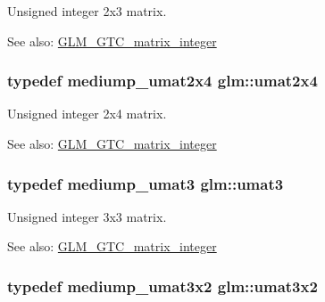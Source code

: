 Unsigned integer 2x3 matrix. \begin{Desc}
\item[See also:]\hyperlink{group__gtc__matrix__integer}{GLM\_\-GTC\_\-matrix\_\-integer} \end{Desc}
\hypertarget{group__gtc__matrix__integer_g3b23b164240cf4dfb429776da7be9d88}{
\subsubsection[umat2x4]{\setlength{\rightskip}{0pt plus 5cm}typedef mediump\_\-umat2x4 {\bf glm::umat2x4}}}
\label{group__gtc__matrix__integer_g3b23b164240cf4dfb429776da7be9d88}


Unsigned integer 2x4 matrix. \begin{Desc}
\item[See also:]\hyperlink{group__gtc__matrix__integer}{GLM\_\-GTC\_\-matrix\_\-integer} \end{Desc}
\hypertarget{group__gtc__matrix__integer_g8b8fbc858e28abf8fc344744f8d6d368}{
\subsubsection[umat3]{\setlength{\rightskip}{0pt plus 5cm}typedef mediump\_\-umat3 {\bf glm::umat3}}}
\label{group__gtc__matrix__integer_g8b8fbc858e28abf8fc344744f8d6d368}


Unsigned integer 3x3 matrix. \begin{Desc}
\item[See also:]\hyperlink{group__gtc__matrix__integer}{GLM\_\-GTC\_\-matrix\_\-integer} \end{Desc}
\hypertarget{group__gtc__matrix__integer_g257300f2710612877ef45438a366e308}{
\subsubsection[umat3x2]{\setlength{\rightskip}{0pt plus 5cm}typedef mediump\_\-umat3x2 {\bf glm::umat3x2}}}
\label{group__gtc__matrix__integer_g257300f2710612877ef45438a366e308}


